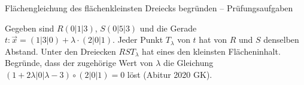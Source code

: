 \begin{aufgabe}{Flächengleichung des flächenkleinsten Dreiecks begründen – Prüfungsaufgaben}
\begin{teile}
\teil Gegeben sind $R(0 | 1 | 3)$, $S(0 | 5 | 3)$ und die Gerade $t\colon \vec x = (1 | 3 | 0) + \lambda \cdot (2 | 0 | 1)$. Jeder Punkt $T_\lambda$ von $t$ hat von $R$ und $S$ denselben Abstand. Unter den Dreiecken $RST_\lambda$ hat eines den kleinsten Flächeninhalt. Begründe, dass der zugehörige Wert von $\lambda$ die Gleichung $(1 + 2\lambda | 0 | \lambda - 3) \circ (2 | 0 | 1) = 0$ löst \hfill (Abitur 2020 GK).
\end{teile}
\end{aufgabe}
